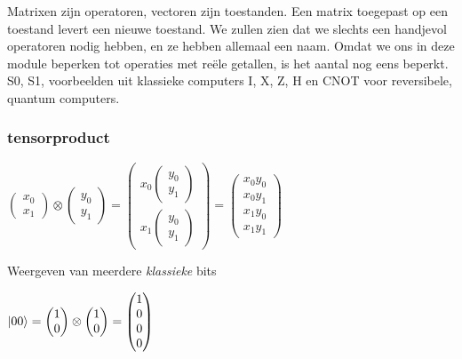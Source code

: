 \documentclass[../../main.tex]{subfiles}
\begin{document}
Matrixen zijn operatoren, vectoren zijn toestanden. Een matrix toegepast op een toestand levert een nieuwe toestand. We zullen zien dat we slechts een handjevol operatoren nodig hebben, en ze hebben allemaal een naam. Omdat we ons in deze module beperken tot operaties met re\"ele getallen, is het aantal nog eens beperkt.
S0, S1, voorbeelden uit klassieke computers
I, X, Z, H en CNOT voor reversibele, quantum computers.

\subsubsection{tensorproduct}

$\begin{pmatrix}
x_0\\
x_1
\end{pmatrix}
\otimes
\begin{pmatrix}
y_0\\
y_1
\end{pmatrix}
=
\begin{pmatrix}
x_0 \begin{pmatrix}
y_0\\
y_1
\end{pmatrix}
\\
x_1\begin{pmatrix}
y_0\\
y_1
\end{pmatrix}

\end{pmatrix}
=
\begin{pmatrix}
x_0y_0\\
x_0y_1\\
x_1y_0\\
x_1y_1
\end{pmatrix}
$

Weergeven van meerdere \textit{klassieke} bits

$
\ket{00}=\begin{pmatrix}
1\\
0
\end{pmatrix}
\otimes
\begin{pmatrix}
1\\
0
\end{pmatrix}
=
\begin{pmatrix}
1\\
0\\
0\\
0
\end{pmatrix}
$
\end{document}
